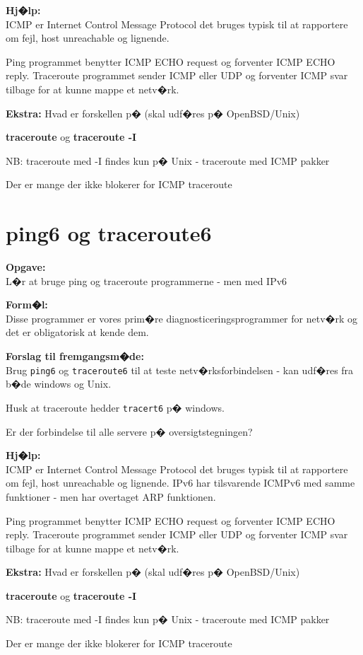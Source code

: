 \documentclass[a4paper,11pt,notitlepage]{oevelser}
\begin{document}
{\bfseries Hj�lp:} \\
ICMP er Internet Control Message Protocol det bruges typisk til at
rapportere om fejl, host unreachable og lignende.

Ping programmet benytter ICMP ECHO request og forventer ICMP ECHO
reply. Traceroute programmet sender ICMP eller UDP og forventer ICMP
svar tilbage for at kunne mappe et netv�rk.

{\bf Ekstra:}
Hvad er forskellen p� (skal udf�res p� OpenBSD/Unix)
\begin{list2}
\item {\bfseries traceroute} og {\bfseries traceroute -I}
\item NB: traceroute med -I findes kun p� Unix - traceroute med ICMP pakker
\item Der er mange der ikke blokerer for ICMP traceroute
\end{list2}


\chapter{ping6 og traceroute6}
\label{ex:ping6}

{\bfseries Opgave:}\\
L�r at bruge ping og traceroute programmerne - men med IPv6

{\bfseries Form�l:}\\
Disse programmer er vores prim�re diagnosticeringsprogrammer for netv�rk og det er obligatorisk at kende dem.

{\bfseries Forslag til fremgangsm�de:} \\
Brug \verb+ping6+ og \verb+traceroute6+ til at teste netv�rksforbindelsen - kan
udf�res fra b�de windows og Unix.

Husk at traceroute hedder \verb+tracert6+ p� windows.

Er der forbindelse til alle servere p� oversigtstegningen?

{\bfseries Hj�lp:} \\
ICMP er Internet Control Message Protocol det bruges typisk til at
rapportere om fejl, host unreachable og lignende. IPv6 har tilsvarende ICMPv6 med samme funktioner - men har overtaget ARP funktionen.

Ping programmet benytter ICMP ECHO request og forventer ICMP ECHO
reply. Traceroute programmet sender ICMP eller UDP og forventer ICMP
svar tilbage for at kunne mappe et netv�rk.

{\bf Ekstra:}
Hvad er forskellen p� (skal udf�res p� OpenBSD/Unix)
\begin{list2}
\item {\bfseries traceroute} og {\bfseries traceroute -I}
\item NB: traceroute med -I findes kun p� Unix - traceroute med ICMP pakker
\item Der er mange der ikke blokerer for ICMP traceroute
\end{list2}
\end{document}
